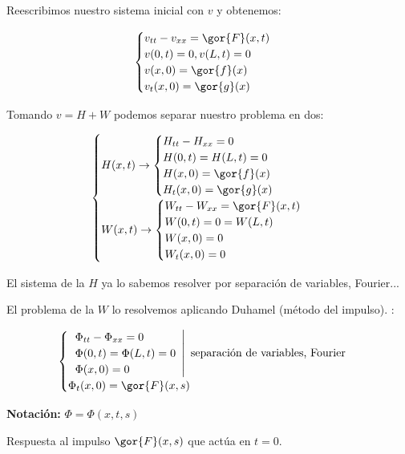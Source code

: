 		 	Reescribimos nuestro sistema inicial con $v$ y obtenemos:

		 	\[ \begin{cases}
		 		v_{tt} - v_{xx} = \gor{F}(x,t)\\
		 		v(0,t) = 0, v(L,t) = 0 \\
		 		v(x,0) = \gor{f}(x) \\
		 		v_t(x,0) = \gor{g}(x)
		 	\end{cases}\]

		 	Tomando $v = H + W$ podemos separar nuestro problema en dos:

		 	\[ \begin{cases}
		 			H(x,t) \rightarrow
		 			\begin{cases}
				 		H_{tt} - H_{xx} = 0\\
				 		H(0,t) = H(L,t) = 0 \\
				 		H(x,0) = \gor{f}(x) \\
				 		H_t(x,0) = \gor{g}(x)
			 		\end{cases}\\
			 		W(x,t) \rightarrow
			 		\begin{cases}
				 		W_{tt} - W_{xx} = \gor{F}(x,t)\\
				 		W(0,t) = 0 = W(L,t) \\
				 		W(x,0) = 0 \\
				 		W_t(x,0) = 0
				 	\end{cases}
				 \end{cases}
			\]

			El sistema de la $H$ ya lo sabemos resolver por separación de variables, Fourier...

			El problema de la $W$ lo resolvemos aplicando Duhamel (método del impulso). :

			\[\begin{cases}
				\left.
				\begin{array}{l}
					\Phi_{tt} - \Phi_{xx} = 0 \\
					\Phi(0,t) = \Phi(L,t) = 0 \\
					\Phi(x,0) = 0 \\
				\end{array}
				\right| \text{ separación de variables, Fourier} \\
				\Phi_t(x,0) = \gor{F}(x,s)
			\end{cases}\]


			\textbf{Notación:} $ \Phi = \Phi(x,t,s) $

			Respuesta al impulso $\gor{F}(x,s)$ que actúa en $t=0$.


